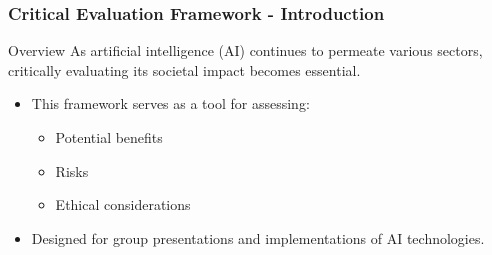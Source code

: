 \documentclass[aspectratio=169]{beamer}
\begin{document}
\begin{frame}[fragile]
    \frametitle{Critical Evaluation Framework - Introduction}
    \begin{block}{Overview}
        As artificial intelligence (AI) continues to permeate various sectors, critically evaluating its societal impact becomes essential.
    \end{block}
    \begin{itemize}
        \item This framework serves as a tool for assessing:
            \begin{itemize}
                \item Potential benefits
                \item Risks
                \item Ethical considerations
            \end{itemize}
        \item Designed for group presentations and implementations of AI technologies.
    \end{itemize}
\end{frame}
\end{document}
